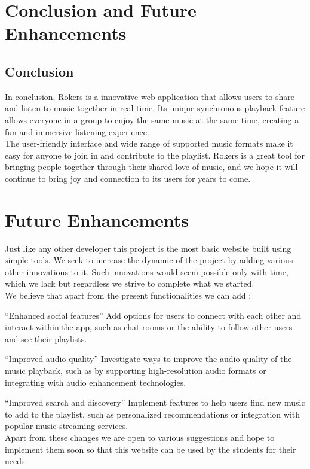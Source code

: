 \chapter{Conclusion and Future Enhancements}

\section{Conclusion}
In conclusion, Rokers is a innovative web application that allows users to share and listen to music together in real-time. Its unique synchronous playback feature allows everyone in a group to enjoy the same music at the same time, creating a fun and immersive listening experience.\\[0.1in] 

The user-friendly interface and wide range of supported music formats make it easy for anyone to join in and contribute to the playlist. Rokers is a great tool for bringing people together through their shared love of music, and we hope it will continue to bring joy and connection to its users for years to come.\\[0.1in]
\pagebreak

\chapter{Future Enhancements}
Just like any other developer this project is the most basic website built using simple tools. We seek to increase the dynamic of the project by adding various other innovations to it. Such innovations would seem possible only with time, which we lack but regardless we strive to complete what we started.\\[0.1in]

We believe that apart from the present functionalities we can add :

“Enhanced social features” Add options for users to connect with each other and interact within the app, such as chat rooms or the ability to follow other users and see their playlists.

“Improved audio quality” Investigate ways to improve the audio quality of the music playback, such as by supporting high-resolution audio formats or integrating with audio enhancement technologies.


“Improved search and discovery” Implement features to help users find new music to add to the playlist, such as personalized recommendations or integration with popular music streaming services.\\[0.1in]


Apart from these changes we are open to various suggestions and hope to implement them soon so that this website can be used by the students for their needs.





